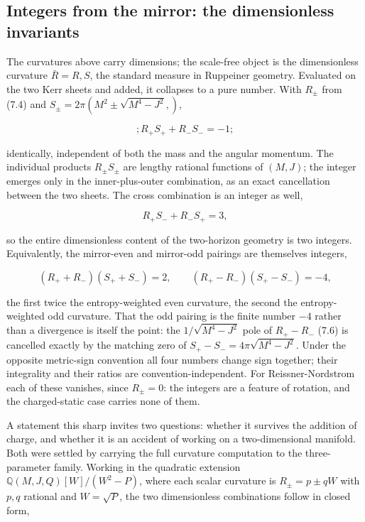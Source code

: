 \documentclass[11pt]{article}
\begin{document}
\subsection{Integers from the mirror: the dimensionless invariants}

The curvatures above carry dimensions; the scale-free object is the dimensionless curvature $\bar R = R,S$, the standard measure in Ruppeiner geometry. Evaluated on the two Kerr sheets and added, it collapses to a pure number. With $R_\pm$ from (7.4) and $S_\pm = 2\pi(M^2 \pm \sqrt{M^4 - J^2},)$,

\begin{equation*}
\boxed{; R_+ S_+ + R_- S_- = -1 ;}
\tag{7.13}
\end{equation*}

identically, independent of both the mass and the angular momentum. The individual products $R_\pm S_\pm$ are lengthy rational functions of $(M,J)$; the integer emerges only in the inner-plus-outer combination, as an exact cancellation between the two sheets. The cross combination is an integer as well,

\begin{equation*}
R_+ S_- + R_- S_+ = 3 ,
\tag{7.14}
\end{equation*}

so the entire dimensionless content of the two-horizon geometry is two integers. Equivalently, the mirror-even and mirror-odd pairings are themselves integers,

\begin{equation*}
(R_+ + R_-)(S_+ + S_-) = 2, \qquad (R_+ - R_-)(S_+ - S_-) = -4 ,
\tag{7.15}
\end{equation*}

the first twice the entropy-weighted even curvature, the second the entropy-weighted odd curvature. That the odd pairing is the finite number $-4$ rather than a divergence is itself the point: the $1/\sqrt{M^4 - J^2}$ pole of $R_+ - R_-$ (7.6) is cancelled exactly by the matching zero of $S_+ - S_- = 4\pi\sqrt{M^4 - J^2}$. Under the opposite metric-sign convention all four numbers change sign together; their integrality and their ratios are convention-independent. For Reissner-Nordstrom each of these vanishes, since $R_\pm = 0$: the integers are a feature of rotation, and the charged-static case carries none of them.

A statement this sharp invites two questions: whether it survives the addition of charge, and whether it is an accident of working on a two-dimensional manifold. Both were settled by carrying the full curvature computation to the three-parameter family. Working in the quadratic extension $\mathbb{Q}(M,J,Q)[W]/(W^2 - P)$, where each scalar curvature is $R_\pm = p \pm qW$ with $p, q$ rational and $W = \sqrt{P}$, the two dimensionless combinations follow in closed form,
\end{document}
